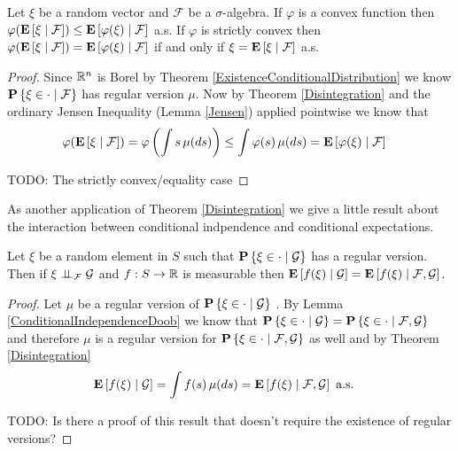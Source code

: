 \begin{thm}\label{JensenConditionalExpectation}Let $\xi$ be a random vector and $\mathcal{F}$ be a
  $\sigma$-algebra.  If $\varphi$ is a convex function then
  $\varphi(\cexpectationlong{\mathcal{F}}{\xi}) \leq
    \cexpectationlong{\mathcal{F}}{\varphi(\xi)}$ a.s.
If $\varphi$ is strictly convex then $\varphi(\cexpectationlong{\mathcal{F}}{\xi}) =
    \cexpectationlong{\mathcal{F}}{\varphi(\xi)}$ if and only if $\xi =
      \cexpectationlong{\mathcal{F}}{\xi}$ a.s.
\end{thm}
\begin{proof}
Since $\reals^n$ is Borel by Theorem
\ref{ExistenceConditionalDistribution} we know
$\cprobability{\mathcal{F}}{\xi \in \cdot}$ has regular version
$\mu$.  Now by Theorem \ref{Disintegration} and the ordinary Jensen
Inequality (Lemma \ref{Jensen}) applied pointwise we know that 
\begin{align*}
\varphi(\cexpectationlong{\mathcal{F}}{\xi}) &= 
\varphi \left( \int s \, \mu(ds) \right) \leq \int \varphi (s)
\, \mu(ds) = \cexpectationlong{\mathcal{F}}{\varphi(\xi)}
\end{align*}

TODO: The strictly convex/equality case
\end{proof}

As another application of Theorem \ref{Disintegration} we give a
little result about the interaction between conditional indpendence
and conditional expectations.
\begin{cor}\label{ConditionalIndependenceConditionalExpectations}Let $\xi$ be a random element in $S$ such that
  $\cprobability{\mathcal{G}}{\xi  \in \cdot}$
has a regular version.  Then if
$\cindependent{\xi}{\mathcal{G}}{\mathcal{F}}$ and $f : S \to \reals$ is
measurable then
$\cexpectationlong{\mathcal{G}}{f(\xi)} = \cexpectationlong{\mathcal{F}, \mathcal{G}}{f(\xi)}$.
\end{cor}
\begin{proof}
Let $\mu$ be a regular version of $\cprobability{\mathcal{G}}{\xi  \in
  \cdot}$ .  By Lemma \ref{ConditionalIndependenceDoob} we know that
$\cprobability{\mathcal{G}}{\xi  \in \cdot} =
\cprobability{\mathcal{F}, \mathcal{G}}{\xi  \in \cdot}$ and therefore
$\mu$ is a regular version for $\cprobability{\mathcal{F}, \mathcal{G}}{\xi  \in \cdot}$ as well and
by Theorem \ref{Disintegration}
\begin{align*}
\cexpectationlong{\mathcal{G}}{f(\xi)} &= \int f(s) \, \mu(ds) =
\cexpectationlong{\mathcal{F}, \mathcal{G}}{f(\xi)} \text { a.s.}
\end{align*}

TODO: Is there a proof of this result that doesn't require the
existence of regular versions?
\end{proof}
 
